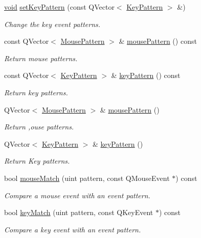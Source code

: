\begin{DoxyCompactItemize}
\hyperlink{group___u_a_v_objects_plugin_ga444cf2ff3f0ecbe028adce838d373f5c}{void} \hyperlink{class_qwt_event_pattern_a73cf4257902b8a9d95aef60fabd3f747}{set\-Key\-Pattern} (const Q\-Vector$<$ \hyperlink{class_qwt_event_pattern_1_1_key_pattern}{Key\-Pattern} $>$ \&)
\begin{DoxyCompactList}\small\item\em Change the key event patterns. \end{DoxyCompactList}\item 
const Q\-Vector$<$ \hyperlink{class_qwt_event_pattern_1_1_mouse_pattern}{Mouse\-Pattern} $>$ \& \hyperlink{class_qwt_event_pattern_a40f66b9b22867b5066d92e9c3f629a81}{mouse\-Pattern} () const 
\begin{DoxyCompactList}\small\item\em Return mouse patterns. \end{DoxyCompactList}\item 
const Q\-Vector$<$ \hyperlink{class_qwt_event_pattern_1_1_key_pattern}{Key\-Pattern} $>$ \& \hyperlink{class_qwt_event_pattern_a3c8dfef92d0808da60d0f7b094ba7f26}{key\-Pattern} () const 
\begin{DoxyCompactList}\small\item\em Return key patterns. \end{DoxyCompactList}\item 
Q\-Vector$<$ \hyperlink{class_qwt_event_pattern_1_1_mouse_pattern}{Mouse\-Pattern} $>$ \& \hyperlink{class_qwt_event_pattern_a141107868ed1c9cf1b34046873234390}{mouse\-Pattern} ()
\begin{DoxyCompactList}\small\item\em Return ,ouse patterns. \end{DoxyCompactList}\item 
Q\-Vector$<$ \hyperlink{class_qwt_event_pattern_1_1_key_pattern}{Key\-Pattern} $>$ \& \hyperlink{class_qwt_event_pattern_a9d8ea5b5ffea570c1fed4c8ca8e5cfff}{key\-Pattern} ()
\begin{DoxyCompactList}\small\item\em Return Key patterns. \end{DoxyCompactList}\item 
bool \hyperlink{class_qwt_event_pattern_aab4d0d2780ed7b3de54502b05fb9f366}{mouse\-Match} (uint pattern, const Q\-Mouse\-Event $\ast$) const 
\begin{DoxyCompactList}\small\item\em Compare a mouse event with an event pattern. \end{DoxyCompactList}\item 
bool \hyperlink{class_qwt_event_pattern_a0a727c4369d8535eed5695a2a76b7e79}{key\-Match} (uint pattern, const Q\-Key\-Event $\ast$) const 
\begin{DoxyCompactList}\small\item\em Compare a key event with an event pattern. \end{DoxyCompactList}\end{DoxyCompactItemize}
